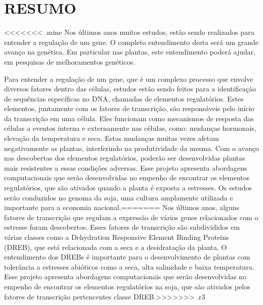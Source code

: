 \chapter{RESUMO}

<<<<<<< .mine
Nos últimos anos muitos estudos, estão sendo realizados para entender a regulação de um gene. O completo entendimento desta será um grande avanço na genética. Em particular nas plantas, este entendimento poderá ajudar, em pesquisas de melhoramentos genéticos.

Para entender a regulação de um gene, que é um complexo processo que envolve diversos fatores dentro das células, estudos estão sendo feitos para a identificação de sequências específicas no DNA, chamadas de elementos regulatórios. Estes elementos, juntamente com os fatores de transcrição, são responsáveis pelo início da transcrição em uma célula. Eles funcionam como mecanismos de resposta das células a eventos interna e externamente nas células, como: mudanças hormonais, elevação da temperatura e seca. Estas mudanças muitas vezes afetam negativamente as plantas, interferindo na produtividade da mesma. Com o avanço nas descobertas dos elementos regulatórios, poderão ser desenvolvidas plantas mais resistentes a essas condições adversas. Esse projeto apresenta abordagens computacionais que serão desenvolvidas no empenho de encontrar os elementos regulatórios, que são ativados quando a planta é exposta a estresses. Os estudos serão conduzidos no genoma da soja, uma cultura amplamente utilizada e importante para a economia nacional.=======
Nos últimos anos, alguns fatores de transcrição que regulam a expressão de vários genes relacionados com o estresse foram descobertos. Esses fatores de transcrição são subdivididos em várias classes como a Dehydration Responsive Element Binding Proteins (DREB), que está relacionada com a seca e a desidratação da planta. O entendimento dos DREBs é importante para o desenvolvimento de plantas com tolerância a estresses abióticos como a seca, alta salinidade e baixa temperatura. Esse projeto apresenta abordagens computacionais que serão desenvolvidas no empenho de encontrar os elementos regulatórios na soja, que são ativados pelos fatores de transcrição pertencentes classe DREB.>>>>>>> .r3
